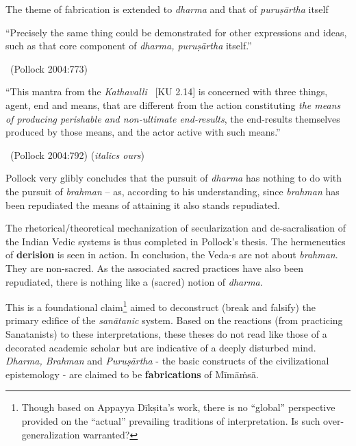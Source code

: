 The theme of fabrication is extended to \textit{dharma} and that of \textit{puruṣārtha} itself

\begin{myquote}
“Precisely the same thing could be demonstrated for other expressions and ideas, such as that core component of \textit{dharma, puruṣārtha} itself.”

~\hfill (Pollock 2004:773)
\end{myquote}

\begin{myquote}
“This mantra from the \textit{Kathavalli}  [KU 2.14] is concerned with three things, agent, end and means, that are different from the action constituting \textit{the means of producing perishable and non-ultimate end-results}, the end-results themselves produced by those means, and the actor active with such means.”

~\hfill (Pollock 2004:792) (\textit{italics ours})
\end{myquote}

Pollock very glibly concludes that the pursuit of \textit{dharma} has nothing to do with the pursuit of \textit{brahman} – as, according to his understanding, since \textit{brahman} has been repudiated the means of attaining it also stands repudiated.

The rhetorical/theoretical mechanization of secularization and de-sacralisation of the Indian Vedic systems is thus completed in Pollock’s thesis. The hermeneutics of \textbf{derision} is seen in action. In conclusion, the Veda-s are not about \textit{brahman}. They are non-sacred. As the associated sacred practices have also been repudiated, there is nothing like a (sacred) notion of \textit{dharma}.

This is a foundational claim\footnote{Though based on Appayya Dīkṣita's work, there is no “global” perspective provided on the “actual” prevailing traditions of interpretation. Is such over-generalization warranted?} aimed to deconstruct (break and falsify) the primary edifice of the \textit{sanātanic} system. Based on the reactions (from practicing Sanatanists) to these interpretations, these theses do not read like those of a decorated academic scholar but are indicative of a deeply disturbed mind. \textit{Dharma, Brahman} and \textit{Puruṣārtha} - the basic constructs of the civilizational epistemology - are claimed to be \textbf{fabrications} of Mīmāṁsā.


